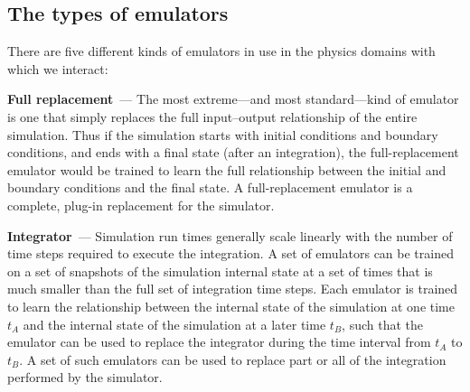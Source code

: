 \documentclass[10pt]{article}
\renewcommand{\paragraph}[1]{\smallskip\par\noindent\textbf{#1}~---}
\begin{document}

\clearpage\begin{appendices}
\section{The types of emulators}\label{app:emulators}
There are five different kinds of emulators in use in the physics domains with which we interact:

\paragraph{Full replacement}
The most extreme---and most standard---kind of emulator is one that simply replaces the full input--output relationship of the entire simulation.
Thus if the simulation starts with initial conditions and boundary conditions, and ends with a final state (after an integration), the full-replacement emulator would be trained to learn the full relationship between the initial and boundary conditions and the final state.
A full-replacement emulator is a complete, plug-in replacement for the simulator.

\paragraph{Integrator}
Simulation run times generally scale linearly with the number of time steps required to execute the integration.
A set of emulators can be trained on a set of snapshots of the simulation internal state at a set of times that is much smaller than the full set of integration time steps.
Each emulator is trained to learn the relationship between the internal state of the simulation at one time $t_A$ and the internal state of the simulation at a later time $t_B$, such that the emulator can be used to replace the integrator during the time interval from $t_A$ to $t_B$.
A set of such emulators can be used to replace part or all of the integration performed by the simulator.


\end{appendices}
\end{document}
